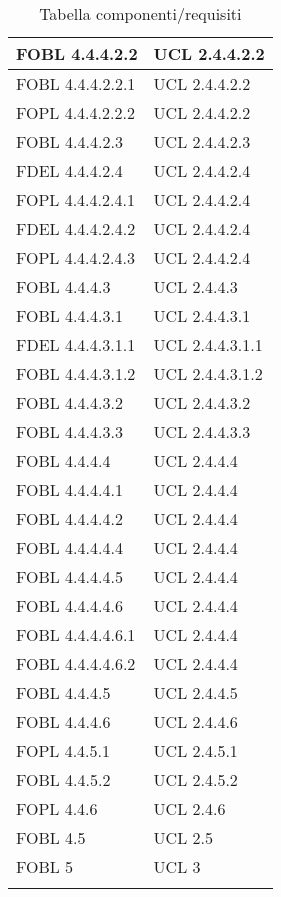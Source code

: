 \begin{longtable}{XX}
\midrule
FOBL 4.4.4.2.2&UCL 2.4.4.2.2\\
\midrule
FOBL 4.4.4.2.2.1&UCL 2.4.4.2.2\\
\midrule
FOPL 4.4.4.2.2.2&UCL 2.4.4.2.2\\
\midrule
FOBL 4.4.4.2.3&UCL 2.4.4.2.3\\
\midrule
FDEL 4.4.4.2.4&UCL 2.4.4.2.4\\
\midrule
FOPL 4.4.4.2.4.1&UCL 2.4.4.2.4\\
\midrule
FDEL 4.4.4.2.4.2&UCL 2.4.4.2.4\\
\midrule
FOPL 4.4.4.2.4.3&UCL 2.4.4.2.4\\
\midrule
FOBL 4.4.4.3&UCL 2.4.4.3\\
\midrule
FOBL 4.4.4.3.1&UCL 2.4.4.3.1\\
\midrule
FDEL 4.4.4.3.1.1&UCL 2.4.4.3.1.1\\
\midrule
FOBL 4.4.4.3.1.2&UCL 2.4.4.3.1.2\\
\midrule
FOBL 4.4.4.3.2&UCL 2.4.4.3.2\\
\midrule
FOBL 4.4.4.3.3&UCL 2.4.4.3.3\\
\midrule
FOBL 4.4.4.4&UCL 2.4.4.4\\
\midrule
FOBL 4.4.4.4.1&UCL 2.4.4.4\\
\midrule
FOBL 4.4.4.4.2&UCL 2.4.4.4\\
\midrule
FOBL 4.4.4.4.4&UCL 2.4.4.4\\
\midrule
FOBL 4.4.4.4.5&UCL 2.4.4.4\\
\midrule
FOBL 4.4.4.4.6&UCL 2.4.4.4\\
\midrule
FOBL 4.4.4.4.6.1&UCL 2.4.4.4\\
\midrule
FOBL 4.4.4.4.6.2&UCL 2.4.4.4\\
\midrule
FOBL 4.4.4.5&UCL 2.4.4.5\\
\midrule
FOBL 4.4.4.6&UCL 2.4.4.6\\
\midrule
FOPL 4.4.5.1&UCL 2.4.5.1\\
\midrule
FOBL 4.4.5.2&UCL 2.4.5.2\\
\midrule
FOPL 4.4.6&UCL 2.4.6\\
\midrule
FOBL 4.5&UCL 2.5\\
\midrule
FOBL 5&UCL 3\\ 
\bottomrule
\caption{Tabella componenti/requisiti}
\end{longtable}